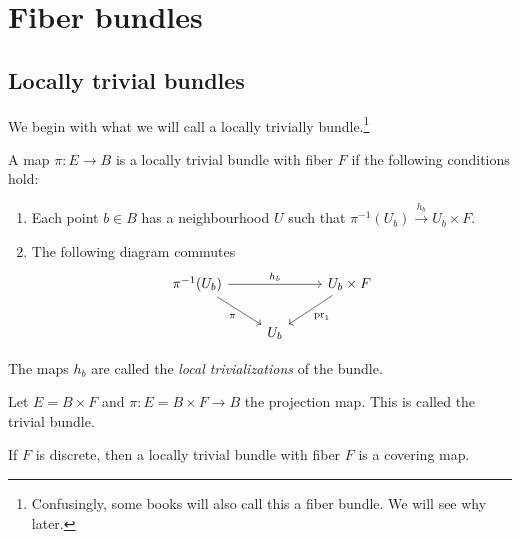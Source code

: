 \documentclass[ma3408.tex]{subfiles}
\begin{document}
\chapter{Fiber bundles}
\section{Locally trivial bundles}
We begin with what we will call a locally trivially bundle.\footnote{Confusingly, some books will also call this a fiber bundle. We will see why later.}
\begin{Def}
A map $\pi \colon E\to B$ is a locally trivial bundle with fiber $F$ if the following conditions hold:
\begin{enumerate}
	\item Each point $b \in B$ has a neighbourhood $U$ such that $\pi^{-1}(U_b) \xrightarrow{h_b} U_b \times F$.
	\item The following diagram commutes
\[\begin{tikzcd}[ampersand replacement=\&]
	{\pi^{-1}(U_b)} \&\& {U_b \times F} \\
	\& {U_b}
	\arrow["{h_b}", from=1-1, to=1-3]
	\arrow["\pi"', from=1-1, to=2-2]
	\arrow["{\text{pr}_1}", from=1-3, to=2-2]
\end{tikzcd}\]
\end{enumerate}
The maps $h_b$ are called the \emph{local trivializations} of the bundle.
\end{Def}
\begin{Exa}
Let $E = B \times F$ and $\pi \colon E  = B \times F \to B$ the projection map. This is called the trivial bundle. 
\end{Exa}
\begin{Exa}
If $F$ is discrete, then a locally trivial bundle with fiber $F$ is a covering map. 
\end{Exa}
\end{document}
